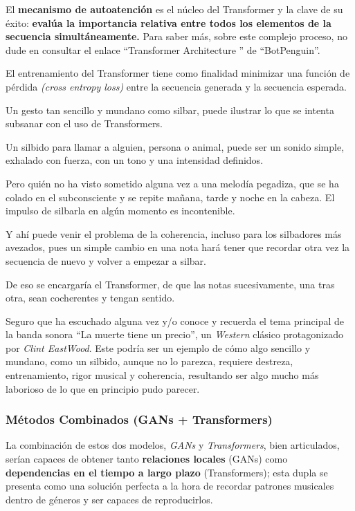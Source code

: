 El \textbf{mecanismo de autoatención} es el núcleo del Transformer y la clave de su éxito: \textbf{evalúa la importancia relativa entre todos los elementos de la secuencia simultáneamente.} Para saber más, sobre este complejo proceso, no dude en consultar el enlace ``Transformer Architecture '' de ``BotPenguin''\cite{botpenguin2025}.

El entrenamiento del Transformer tiene como finalidad minimizar una función de pérdida \emph{(cross entropy loss)} entre la secuencia generada y la secuencia esperada.

\begin{tcolorbox}[title=Silbar es cosa de niños,colback=gray!10, colframe=gray!50, sharp corners=south]

Un gesto tan sencillo y mundano como silbar, puede ilustrar lo que se intenta subsanar con el uso de Transformers.

Un silbido para llamar a alguien, persona o animal, puede ser un sonido simple, exhalado con fuerza, con un tono y una intensidad definidos.

Pero quién no ha visto sometido alguna vez a una melodía pegadiza, que se ha colado en el subconsciente y se repite mañana, tarde y noche en la cabeza. El impulso de silbarla en algún momento es incontenible.

Y ahí puede venir el problema de la coherencia, incluso para los silbadores más avezados, pues un simple cambio en una nota hará tener que recordar otra vez la secuencia de nuevo y volver a empezar a silbar.

De eso se encargaría el Transformer, de que las notas sucesivamente, una tras otra, sean cocherentes y tengan sentido.

Seguro que ha escuchado alguna vez y/o conoce y recuerda el tema principal de la banda sonora ``La muerte tiene un precio'', un \emph{Western} clásico protagonizado por \emph{Clint EastWood}. Este podría ser un ejemplo de cómo algo sencillo y mundano, como un silbido, aunque no lo parezca, requiere destreza, entrenamiento, rigor musical y coherencia, resultando ser algo mucho más laborioso de lo que en principio pudo parecer.

\end{tcolorbox}

\subsubsection{Métodos Combinados (GANs + Transformers)}

La combinación de estos dos modelos, \textit{GANs} y \textit{Transformers}, bien articulados, serían capaces de obtener tanto \textbf{relaciones locales} (GANs) como \textbf{dependencias en el tiempo a largo plazo} (Transformers); esta dupla se presenta como una solución perfecta a la hora de recordar patrones musicales dentro de géneros y ser capaces de reproducirlos.

